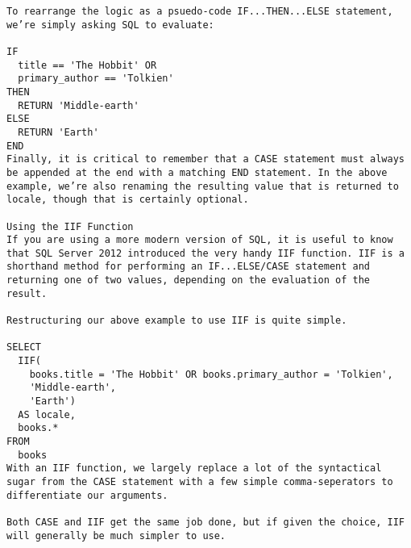 \begin{lstlisting}[frame=single]
To rearrange the logic as a psuedo-code IF...THEN...ELSE statement, we’re simply asking SQL to evaluate:

IF
  title == 'The Hobbit' OR
  primary_author == 'Tolkien'
THEN
  RETURN 'Middle-earth'
ELSE
  RETURN 'Earth'
END
Finally, it is critical to remember that a CASE statement must always be appended at the end with a matching END statement. In the above example, we’re also renaming the resulting value that is returned to locale, though that is certainly optional.

Using the IIF Function
If you are using a more modern version of SQL, it is useful to know that SQL Server 2012 introduced the very handy IIF function. IIF is a shorthand method for performing an IF...ELSE/CASE statement and returning one of two values, depending on the evaluation of the result.

Restructuring our above example to use IIF is quite simple.

SELECT
  IIF(
    books.title = 'The Hobbit' OR books.primary_author = 'Tolkien',
    'Middle-earth',
    'Earth')
  AS locale,
  books.*
FROM
  books
With an IIF function, we largely replace a lot of the syntactical sugar from the CASE statement with a few simple comma-seperators to differentiate our arguments.

Both CASE and IIF get the same job done, but if given the choice, IIF will generally be much simpler to use.

\end{lstlisting}

\newpage

